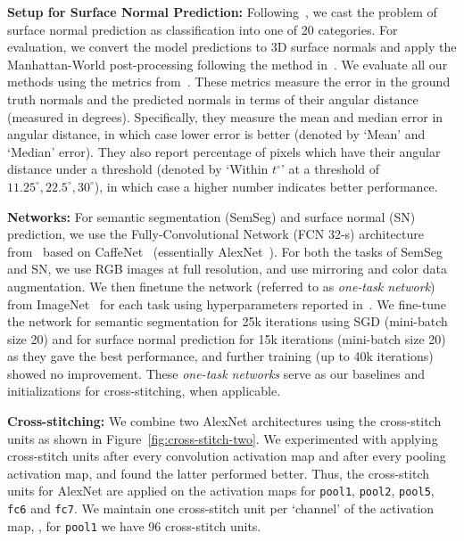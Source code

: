\documentclass[10pt,twocolumn,letterpaper]{article}
\begin{document}
\par \noindent \textbf{Setup for Surface Normal Prediction:}
Following~\cite{wangfouhey}, we cast the problem of surface normal prediction as classification into one of 20 categories. 
For evaluation, we convert the model predictions to 3D surface normals and apply the Manhattan-World post-processing following the method in~\cite{wangfouhey}.
We evaluate all our methods using the metrics from~\cite{3dp}. These metrics measure the error in the ground truth normals and the predicted normals in terms of their angular distance (measured in degrees). Specifically, they measure the mean and median error in angular distance, in which case lower error is better (denoted by `Mean' and `Median' error). They also report percentage of pixels which have their angular distance under a threshold (denoted by `Within $t^{\circ}$' at a threshold of $11.25^{\circ}, 22.5^{\circ}, 30^{\circ}$), in which case a higher number indicates better performance.

\par \noindent \textbf{Networks:} For semantic segmentation (SemSeg) and surface normal (SN) prediction, we use the Fully-Convolutional Network (FCN 32-s) architecture from~\cite{fcn} based on CaffeNet~\cite{caffe} (essentially AlexNet~\cite{alexnet}). For both the tasks of SemSeg and SN, we use RGB images at full resolution, and use mirroring and color data augmentation.
We then finetune the network (referred to as \emph{one-task network}) from ImageNet~\cite{imagenet} for each task using hyperparameters reported in~\cite{fcn}. We fine-tune the network for semantic segmentation for 25k iterations using SGD (mini-batch size 20) and for surface normal prediction for 15k iterations (mini-batch size 20) as they gave the best performance, and further training (up to 40k iterations) showed no improvement. These \emph{one-task networks} serve as our baselines and initializations for cross-stitching, when applicable.

\par \noindent \textbf{Cross-stitching:} We combine two AlexNet architectures using the cross-stitch units as shown in Figure~\ref{fig:cross-stitch-two}. We experimented with applying cross-stitch units after every convolution activation map and after every pooling activation map, and found the latter performed better. Thus, the cross-stitch units for AlexNet are applied on the activation maps for \texttt{pool1}, \texttt{pool2}, \texttt{pool5}, \texttt{fc6} and \texttt{fc7}. We maintain one cross-stitch unit per `channel' of the activation map, \eg, for \texttt{pool1} we have 96 cross-stitch units.
\end{document}
